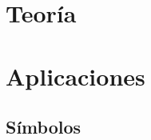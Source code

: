 



\maketitle



\tableofcontents

\part{Teoría}



\part{Aplicaciones}


\appendix

\chapter{Símbolos}

